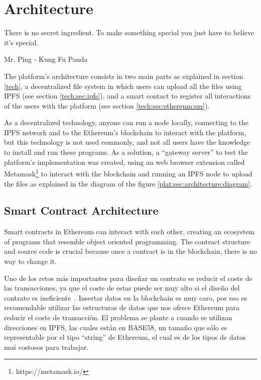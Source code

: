 
\chapter{Architecture}

\begin{FraseCelebre}
  \begin{Frase}
    There is no secret ingredient. To make something special you just have to
    believe it's special.
  \end{Frase}
  \begin{Fuente}
    Mr. Ping - Kung Fu Panda
  \end{Fuente}
\end{FraseCelebre}

The platform's architecture consists in two main parts as explained in section
\ref{tech}, a decentralized file system in which users can upload all the files
using IPFS (see section \ref{tech:sec:ipfs}), and a smart contact to register
all interactions of the users with the platform (see section
\ref{tech:sec:ethereum:sm}).

As a decentralized technology, anyone can run a node locally, connecting to the
IPFS network and to the Ethereum's blockchain to interact with the platform, but
this technology is not used commonly, and not all users have the knowledge to
install and run these programs. As a solution, a ``gateway server'' to test the
platform's implementation was created, using an web browser extension called
Metamask\footnote[1]{https://metamask.io/} to interact with the blockchain and
running an IPFS node to upload the files as explained in the diagram of the
figure \ref{plat:sec:architecture:diagram}.


\section{Smart Contract Architecture}
\label{arch:sca}
Smart contracts in Ethereum can interact with each other, creating an ecosystem
of programs that resemble object oriented programming. The contract structure
and source code is crucial because once a contract is in the blockchain, there
is no way to change it.

Uno de los retos más importantes para diseñar un contrato es reducir el coste de
las transacciones, ya que el coste de estas puede ser muy alto si el diseño del
contrato es ineficiente~\cite{croman2016scaling}. Insertar datos en la
blockchain es muy caro, por eso es recomendable utilizar las estructuras de
datos que nos ofrece Ethereum para reducir el coste de transacción. El problema
se plante a cuando se utilizan direcciones en IPFS, las cuales están en BASE58,
un tamaño que sólo es representable por el tipo ``string'' de Ethereum, el cual
es de los tipos de datos maś costosos para trabajar.

